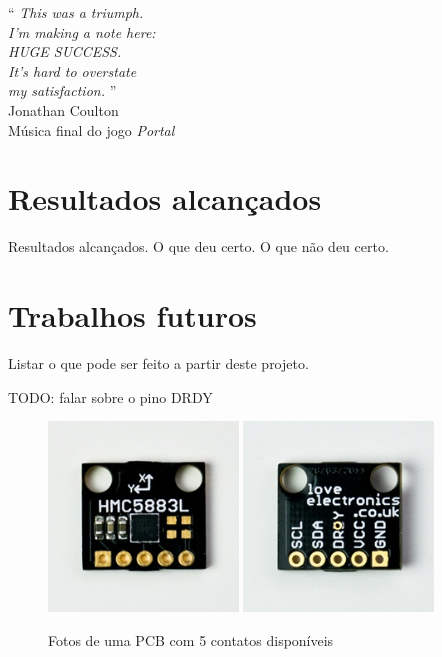 \documentclass[brazil,pagestart=firstchapter]{abnt}
\begin{document}
\vfill{}
\begin{flushright}{}
``\emph{
	This was a triumph.    \\
	I'm making a note here:\\
	HUGE SUCCESS.          \\
	It's hard to overstate \\
	my satisfaction.
}''\\
{\small Jonathan Coulton} \\
{\small Música final do jogo \textit{Portal}}
\end{flushright}{\small \par}
\vfill{}

\newpage


\section{Resultados alcançados}
\label{sec:resultados}

Resultados alcançados. O que deu certo. O que não deu certo.

\section{Trabalhos futuros}
\label{sec:trabalhos_futuros}

Listar o que pode ser feito a partir deste projeto.


TODO: falar sobre o pino DRDY

\begin{figure}[h]
\centering
\includegraphics[width=0.45\textwidth]{img/sensor_other_pcb_top.jpg}
\includegraphics[width=0.45\textwidth]{img/sensor_other_pcb_bottom.jpg}
\caption{Fotos de uma PCB com 5 contatos disponíveis}
\label{fig:loveelectronics_photos}
\end{figure}
\end{document}
